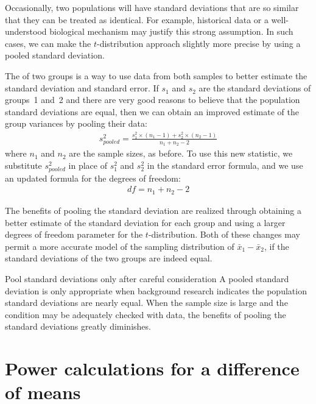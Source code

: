 Occasionally, two populations will have standard deviations
that are so similar that they can be treated as identical.
For example, historical data or a well-understood biological
mechanism may justify this strong assumption.
In such cases, we can make the $t$-distribution approach
slightly more precise by using a pooled standard deviation.

The  of two groups is a way
to use data from both samples to better estimate the standard
deviation and standard error.
If $s_1^{}$ and $s_2^{}$ are the standard deviations
of groups~1 and~2 and there are very good reasons to believe
that the population standard deviations are equal,
then we can obtain an improved estimate of the group variances
by pooling their data:
\begin{align*}
s_{pooled}^2 = \frac{s_1^2\times (n_1-1) + s_2^2\times (n_2-1)}{n_1 + n_2 - 2}
\end{align*}
where $n_1$ and $n_2$ are the sample sizes, as before.
To use this new statistic, we substitute $s_{pooled}^2$
in place of $s_1^2$ and $s_2^2$ in the standard error formula,
and we use an updated formula for the degrees of freedom:
\begin{align*}
df = n_1 + n_2 - 2
\end{align*}

The benefits of pooling the standard deviation are realized
through obtaining a better estimate of the standard deviation
for each group and using a larger degrees of freedom parameter
for the $t$-distribution.
Both of these changes may permit a more accurate model of the
sampling distribution of $\bar{x}_1 - \bar{x}_2$,
if the standard deviations of the two groups are indeed equal.

\begin{onebox}
    {Pool standard deviations only after careful consideration}
  A pooled standard deviation is only appropriate when
  background research indicates the population standard
  deviations are nearly equal.
  When the sample size is large and the condition
  may be adequately checked with data, the benefits
  of pooling the standard deviations greatly diminishes.
\end{onebox}



\section{Power calculations for a difference of means}
\label{PowerForDifferenceOfTwoMeans}

